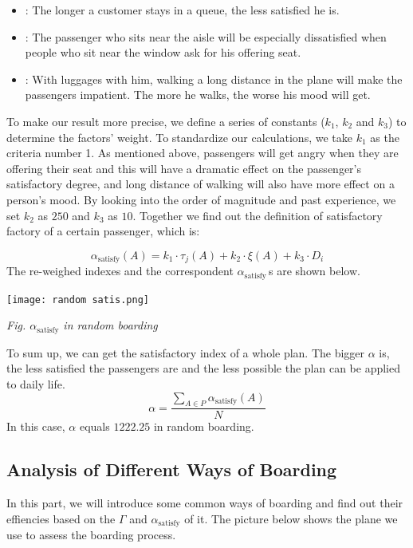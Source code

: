 \documentclass{article}
\begin{document}
	\begin{itemize}
		\item {}: The longer a customer stays in a queue, the less satisfied he is.
		\item {}: The passenger who sits near the aisle will be especially dissatisfied when people who sit near the window ask for his offering seat.
		\item {}: With luggages with him, walking a long distance in the plane will make the passengers impatient. The more he walks, the worse his mood will get.
	\end{itemize}
	To make our result more precise, we define a series of constants ($k_1$, $k_2$ and $k_3$) to determine the factors' weight. To standardize our calculations, we take $k_1$ as the criteria number 1. As mentioned above, passengers will get angry when they are offering their seat and this will have a dramatic effect on the passenger's satisfactory degree, and long distance of walking will also have more effect on a person's mood. By looking into the order of magnitude and past experience, we set \(k_2\) as \(250\) and \(k_3\) as \(10\).
	Together we find out the definition of satisfactory factory of a certain passenger, which is:

	$$\alpha_\text{satisfy}(A)=k_1\cdot \tau_j(A)+k_2\cdot\xi\left(A\right)+k_3\cdot D_i$$
	The re-weighed indexes and the correspondent \(\alpha_{\mathrm{satisfy}}\,\)s are shown below.
	\begin{center}
		\texttt{[image: random satis.png]}

		\small\textit{Fig. \(\alpha_{\mathrm{satisfy}}\) in random boarding}
	\end{center}
	To sum up, we can get the satisfactory index of a whole plan. The bigger $\alpha$ is, the less satisfied the passengers are and the less possible the plan can be applied to daily life.
	$$\alpha=\dfrac{\sum\limits_{A\in P} \alpha_\text{satisfy}(A)}{N}$$
	In this case, \(\alpha\) equals \(1222.25\) in random boarding.

	\subsection{Analysis of Different Ways of Boarding}
	In this part, we will introduce some common ways of boarding and find out their effiencies based on the $\Gamma$ and $\alpha_\text{satisfy}$ of it. The picture below shows the plane we use to assess the boarding process.
\end{document}
